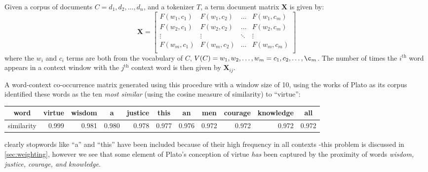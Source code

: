 \begin{definition}
  Given a corpus of documents $C=d_1,d_2,\dots,d_n$, and a tokenizer $T$, a term document matrix $\bm{X}$ is given by:
  \begin{equation}
    \bm{X}=
  \begin{bmatrix}
    F(w_1,c_1) & F(w_1,c_2) & \dots  & F(w_1,c_m) \\
    F(w_2,c_1) & F(w_2,c_2) & \dots  & F(w_2,c_m) \\
    \vdots        & \vdots        & \ddots & \vdots          \\
    F(w_m,c_1) & F(w_m,c_2) & \dots  & F(w_m,c_m) \\
  \end{bmatrix}
  \end{equation}
  where the $w_i$ and $c_i$ terms are both from the vocabulary of $C$, $V(C)=w_1,w_2,\dots,w_m=c_1,c_2,\dots,\c_m$.
  The number of times the $i^{\text{th}}$ word appears in a context window with the $j^{\text{th}}$ context word is then given by $\bm{X}_{ij}$.
\end{definition}

\begin{example}
  A word-context co-occurrence matrix generated using this procedure with a window size of 10, using the works of Plato as its corpus identified these words as the ten \emph{most similar} (using the cosine measure of similarity) to ``virtue'':
  \begin{center}{\footnotesize
      \captionsetup{width=.91\linewidth}
      \begin{tabular}{c r r r r r r r r r r}
        \toprule
        word & \multicolumn{1}{c}{virtue} & \multicolumn{1}{c}{wisdom} & \multicolumn{1}{c}{a} & \multicolumn{1}{c}{justice} & \multicolumn{1}{c}{this} & \multicolumn{1}{c}{an} & \multicolumn{1}{c}{men} & \multicolumn{1}{c}{courage} & \multicolumn{1}{c}{knowledge} & \multicolumn{1}{c}{all} \\
        \midrule
        similarity & 0.999 & 0.981 & 0.980 & 0.978 & 0.977 & 0.976 & 0.972 & 0.972 & 0.972 & 0.972 \\
        \bottomrule
      \end{tabular}
      \label{tab:plato-doc-term}
    }\end{center}
  clearly stopwords like ``a'' and ``this'' have been included because of their high frequency in all contexts -this problem is discussed in \autoref{sec:weighting}, however we see that some element of Plato's conception of virtue \emph{has} been captured by the proximity of words \emph{wisdom, justice, courage, and knowledge}.
\end{example}

